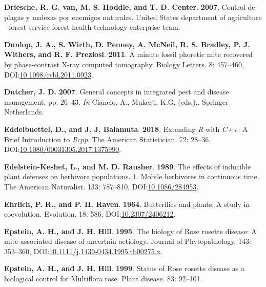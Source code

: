 \documentclass[12pt,final,CPage]{ufthesis}
\newlength{\cslhangindent}
\newenvironment{CSLReferences}[2] %
{%
	\setlength{\parindent}{0pt}
	\ifodd #1 \everypar{\setlength{\hangindent}{\cslhangindent}}\ignorespaces\fi
	\ifnum #2 > 0
	\setlength{\parskip}{#2\baselineskip}
	\fi
}%
{}
\begin{document}
{\begin{CSLReferences}{1}{0}
  \leavevmode{}%
  \textbf{Driesche, R. G. van, M. S. Hoddle, and T. D. Center}. \textbf{2007}. Control de plagas y malezas por enemigos naturales. {United States} department of agriculture - forest service forest health technology enterprise team.

  \leavevmode{}%
  \textbf{Dunlop, J. A., S. Wirth, D. Penney, A. McNeil, R. S. Bradley, P. J. Withers, and R. F. Preziosi}. \textbf{2011}. A minute fossil phoretic mite recovered by phase-contrast {X-ray} computed tomography. Biology Letters. 8: 457--460, DOI:\href{https://doi.org/10.1098/rsbl.2011.0923}{10.1098/rsbl.2011.0923}.

  \leavevmode{}%
  \textbf{Dutcher, J. D.} \textbf{2007}. General concepts in integrated pest and disease management, pp. 26--43. \emph{In} Ciancio, A., Mukerji, K.G. (eds.),. Springer Netherlands.

  \leavevmode{}%
  \textbf{Eddelbuettel, D., and J. J. Balamuta}. \textbf{2018}. {Extending \emph{R} with \emph{C++}: A Brief Introduction to \emph{Rcpp}}. The American Statistician. 72: 28--36, DOI:\href{https://doi.org/10.1080/00031305.2017.1375990}{10.1080/00031305.2017.1375990}.

  \leavevmode{}%
  \textbf{Edelstein-Keshet, L., and M. D. Rausher}. \textbf{1989}. The effects of inducible plant defenses on herbivore populations. 1. Mobile herbivores in continuous time. The American Naturalist. 133: 787--810, DOI:\href{https://doi.org/10.1086/284953}{10.1086/284953}.

  \leavevmode{}%
  \textbf{Ehrlich, P. R., and P. H. Raven}. \textbf{1964}. Butterflies and plants: A study in coevolution. Evolution. 18: 586, DOI:\href{https://doi.org/10.2307/2406212}{10.2307/2406212}.

  \leavevmode{}%
  \textbf{Epstein, A. H., and J. H. Hill}. \textbf{1995}. The biology of {Rose rosette disease}: A mite-associated disease of uncertain aetiology. Journal of Phytopathology. 143: 353--360, DOI:\href{https://doi.org/10.1111/j.1439-0434.1995.tb00275.x}{10.1111/j.1439-0434.1995.tb00275.x}.

  \leavevmode{}%
  \textbf{Epstein, A. H., and J. H. Hill}. \textbf{1999}. Status of {Rose rosette disease} as a biological control for {Multiflora rose}. Plant disease. 83: 92--101.


\end{CSLReferences}}
\end{document}
